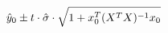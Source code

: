 \documentclass[preview]{standalone}
\begin{document}
\begin{align*}
\special{dvisvgm:raw <g id='unique000'>}\hat{y}_0 \pm t \cdot \hat{\sigma} \cdot \sqrt{1 + x_0^T (X^T X)^{-1} x_0}\special{dvisvgm:raw </g>}
\end{align*}
\end{document}
